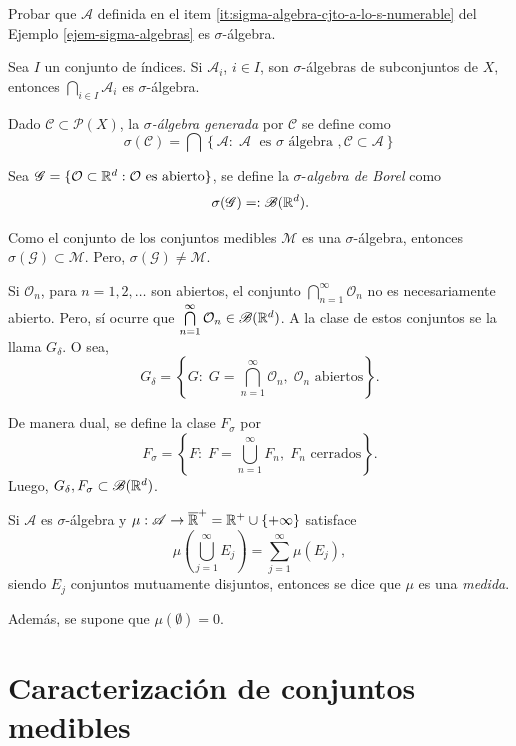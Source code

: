 \begin{ejercicio}{}
Probar que  $\mathscr{A}$ definida en el item \ref{it:sigma-algebra-cjto-a-lo-s-numerable} del Ejemplo \ref{ejem-sigma-algebras} es $\sigma$-\'algebra.
\end{ejercicio}

Sea  $I$ un conjunto de \'indices.
Si $\mathscr{A}_i$, $i \in I$,  son $\sigma$-\'algebras de subconjuntos de $X$, entonces $\bigcap\limits_{i \in I} \mathscr{A}_i$ es $\sigma$-\'algebra. 

Dado $\mathscr{C}\subset \mathscr{P}(X)$, la \emph{$\sigma$-\'algebra
generada} por $\mathscr{C}$ se define como
\[\sigma(\mathscr{C})=\bigcap\left\{\mathscr{A}:\;\mathscr{A}\;\mbox{ es $\sigma$ \'algebra }, \mathscr{C} \subset \mathscr{A} \right \}
\]


Sea $\mathscr{G}=\{\mathcal{O}\subset \mathbb{R}^d: \mathcal{O} \mbox{ es abierto} \}$, se define la $\sigma$-\emph{\;algebra de Borel} como
\[
\sigma(\mathscr{G})=:\mathscr{B}(\mathbb{R}^d).
\]

Como el conjunto de los conjuntos medibles $\mathscr{M}$ es una $\sigma$-\'algebra, entonces $\sigma(\mathscr{G})\subset \mathscr{M}$.
Pero, $\sigma(\mathscr{G})\neq \mathscr{M}$.

Si $\mathcal{O}_n$, para $n=1,2,\ldots$ son abiertos, el conjunto
$\bigcap\limits_{n=1}^{\infty} \mathcal{O}_n$ no es necesariamente abierto. Pero, s\'i ocurre que $\bigcap\limits_{n=1}^{\infty} \mathcal{O}_n \in \mathscr{B}(\mathbb{R}^d)$. 
A la clase de estos conjuntos se la llama $G_{\delta}$.
O sea, 
\[
G_{\delta}=\left\{  
G:\; G=\bigcap\limits_{n=1}^{\infty} \mathcal{O}_n,\; \mathcal{O}_n \mbox{ abiertos}
\right\}.
\]


De manera dual, se define la clase $F_{\sigma}$ por
\[
F_{\sigma}=\left\{  
F:\; F=\bigcup\limits_{n=1}^{\infty} F_n,\; F_n \mbox{ cerrados}
\right\}.
\]
Luego,  $G_{\delta}, F_{\sigma} \subset \mathscr{B}(\mathbb{R}^d)$.

\begin{definicion}{}
Si $\mathscr{A}$  es $\sigma$-\'algebra y $\mu:\mathscr{A} \to \overline{\mathbb{R}}^+=\mathbb{R}^+\cup\{+\infty\}$ satisface
\[\mu\left(\bigcup\limits_{j=1}^{\infty}E_j \right)
=\sum\limits_{j=1}^{\infty}\mu(E_j),
\]
siendo $E_j$ conjuntos mutuamente disjuntos, 
entonces se dice que $\mu$ es una \emph{medida}.

Adem\'as, se supone que $\mu(\emptyset)=0$.
\end{definicion}


\section{Caracterización de conjuntos medibles}

